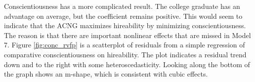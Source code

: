 \documentclass[review]{elsarticle}
\begin{document}



Conscientiousness has a more complicated result.
The college graduate has an advantage on average, but the coefficient remains positive.
This would seem to indicate that the ACNG maximizes hireability by minimizing conscientiousness.
The reason is that there are important nonlinear effects that are missed in Model 7.
Figure \ref{fig:conc_rvfp} is a scatterplot of residuals from a simple regression of comparative conscientiousness on hireability.
The plot indicates a residual trend down and to the right with some heteroscedasticity.
Looking along the bottom of the graph shows an m-shape, which is consistent with cubic effects.
\end{document}

